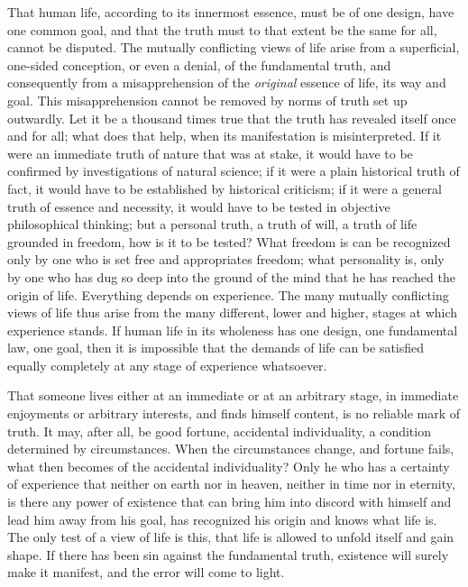 \documentclass[12pt,a4paper,openany]{book}
\newcommand{\opage}[1]{\marginnote{\footnotesize\textit{[#1]}}}
\begin{document}
That human life, according to its innermost essence, must be of one design, have one common goal,
and that the truth must to that extent be the same for all, cannot be disputed. The mutually
conflicting views of life arise from a superficial, one-sided conception, or even a denial, of the
fundamental truth, and consequently from a misapprehension of the \emph{original} essence of life,
its way and goal. This misapprehension cannot be removed by norms of truth set up outwardly. Let it
be a thousand times true that the truth has revealed itself once and for all; what does that help,
when its manifestation
\setcounter{footnote}{0}%
\opage{15}is misinterpreted. If it were an immediate truth of nature that was at stake, it would have
to be confirmed by investigations of natural science; if it were a plain historical truth of fact,
it would have to be established by historical criticism; if it were a general truth of essence and
necessity, it would have to be tested in objective philosophical thinking; but a personal truth, a
truth of will, a truth of life grounded in freedom, how is it to be tested? What freedom is can be
recognized only by one who is set free and appropriates freedom; what personality is, only by one
who has dug so deep into the ground of the mind that he has reached the origin of life. Everything
depends on experience. The many mutually conflicting views of life thus arise from the many
different, lower and higher, stages at which experience stands. If human life in its wholeness has
one design, one fundamental law, one goal, then it is impossible that the demands of life can be
satisfied equally completely at any stage of experience whatsoever.

That someone lives either at an immediate or at an arbitrary stage, in immediate enjoyments or
arbitrary interests, and finds himself content, is no reliable mark of truth. It may, after all, be
good fortune, accidental individuality, a condition determined by circumstances. When the
circumstances change, and fortune fails, what then becomes of the accidental individuality? Only he
who has a certainty of experience that neither on earth nor in heaven, neither in time nor in
eternity, is there any power of existence that can bring him into discord with himself and lead him
away from his goal, has recognized his origin and knows what life is. The only test of a view of
life is this,
\setcounter{footnote}{0}%
\opage{16}that life is allowed to unfold itself and gain shape. If there has been sin against the
fundamental truth, existence will surely make it manifest, and the error will come to light.
\end{document}

